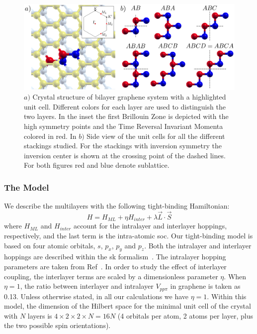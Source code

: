 \begin{figure}[h!]
\centering
\includegraphics{chapter04/figures/structure.png}
\caption{$a)$ Crystal structure of bilayer graphene system with a highlighted unit cell. Different colors for each layer are used to distinguish the two layers. In the inset the first Brillouin Zone is depicted with the high symmetry points and the Time Reversal Invariant Momenta colored in red. In $b)$ Side view of the unit cells for all the different stackings studied. For the stackings with inversion symmetry the inversion center is shown at the crossing point of the dashed lines. For both figures red and blue denote sublattice.}
\label{Structure}
\end{figure}

\subsubsection{The Model}
We describe the multilayers with the following tight-binding Hamiltonian:
\begin{equation}
 H = H_{ML} + \eta H_{inter} + \lambda\vec{L}\cdot\vec{S}
\label{Hamil}
\end{equation}
where $H_{ML}$ and $H_{inter} $ account for the intralayer and interlayer  hoppings, respectively, and the last term is the intra-atomic \ac{soc}. Our tight-binding model is based on four atomic orbitals,  $s$, $p_{x}$, $p_{y}$ and $p_{z}$.
Both the intralayer and interlayer hoppings are described within the \acf{sk} formalism~\cite{Slater1954}. The intralayer hopping parameters are taken from Ref~\cite{Gosalbez-Martinez2011}. In order to study the effect of interlayer coupling, the interlayer terms are scaled by a dimensionless parameter $\eta$. When $\eta=1$, the ratio between interlayer and intralayer $V_{pp\pi}$ in graphene is taken as~\cite{Katsnelson2012} 0.13. Unless otherwise stated, in all our calculations we have $\eta=1$.
Within this model, the dimension of the Hilbert space for the minimal unit cell of the crystal with $N$ layers is $4\times2\times2\times N = 16N$ (4 orbitals per atom, 2 atoms per layer, plus the two possible spin orientations).

